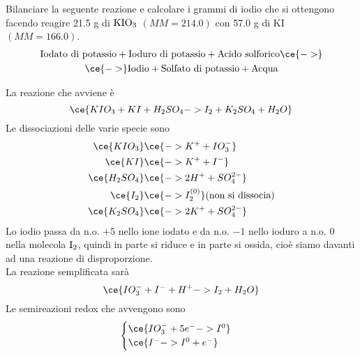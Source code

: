 \begin{esercizio}
    Bilanciare la seguente reazione e calcolare i grammi di iodio che si ottengono facendo reagire 21.5 g di $\rm KIO_3$ $(MM=214.0)$ con 57.0 g di KI $(MM=166.0)$.
    \begin{gather*}
        \text{Iodato di potassio}
        + \text{Ioduro di potassio}
        + \text{Acido solforico}
        \ce{->}
        \\
        \ce{->}
        \text{Iodio}
        + \text{Solfato di potassio}
        + \text{Acqua}
    \end{gather*}
\end{esercizio}
\begin{soluzione}
    La reazione che avviene è
    \begin{equation*}
        \ce{KIO_3 + KI + H_2SO_4 -> I_2 + K_2SO_4 + H_2O}
    \end{equation*}
    Le dissociazioni delle varie specie sono
    \begin{equation*}
        \begin{split}
            \ce{KIO_3} & \ce{-> K^+ + IO_3^-}
            \\
            \ce{KI} & \ce{-> K^+ + I^-}
            \\
            \ce{H_2SO_4} & \ce{-> 2H^+ + SO_4^{2-}}
            \\
            \ce{I_2} & \ce{-> I_2^{(0)}}\text{(non si dissocia)}
            \\
            \ce{K_2SO_4} & \ce{-> 2K^+ + SO_4^{2-}}
            \\
        \end{split}
    \end{equation*}
    Lo iodio passa da n.o. $+5$ nello ione iodato e da n.o. $-1$ nello ioduro a n.o. $0$ nella molecola $\rm I_2$, quindi in parte si riduce e in parte si ossida, cioè siamo davanti ad una reazione di disproporzione.\\
    La reazione semplificata sarà
    \begin{equation*}
        \ce{IO_3^- + I^- + H^+ -> I_2 + H_2O}
    \end{equation*}
    Le semireazioni redox che avvengono sono 
    \begin{equation*}
        \begin{cases}
            \ce{IO_3^- + 5e^- -> I^0}\\
            \ce{I^- -> I^0 + e^-}
        \end{cases}
    \end{equation*}

\end{soluzione}
